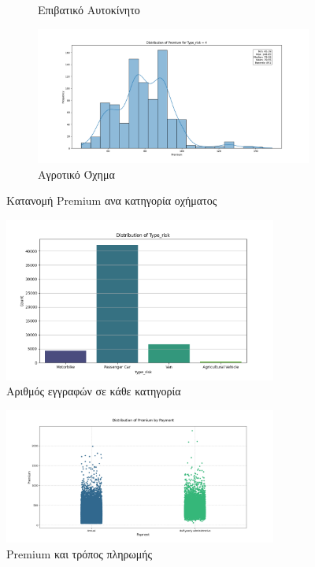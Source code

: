\documentclass{llncs}
\begin{document}
\begin{figure}[h!]
\begin{subfigure}{0.45\linewidth}
       \caption{Επιβατικό Αυτοκίνητο}
       \label{fig:subfig3}
        \end{subfigure}
         \begin{subfigure}{0.45\linewidth}
        \includegraphics[width=\linewidth]{images/premium_risk4.png}
        \caption{Αγροτικό Όχημα}
        \label{fig:subfig4}
         \end{subfigure}
  \caption{Κατανομή Premium ανα κατηγορία οχήματος}
  \label{fig:subfigures4}
\end{figure}

\begin{figure}
    \begin{center}
        \includegraphics[width=0.8\textwidth]{images/Type_risk.png}
    \end{center}
    \caption{Αριθμός εγγραφών σε κάθε κατηγορία} 
    \label{fig:Type_risk}   
\end{figure}

\begin{figure}
    \begin{center}
        \includegraphics[width=0.8\textwidth]{images/PaymentAll.png}
    \end{center}
    \caption{Premium και τρόπος πληρωμής} 
    \label{fig:premium_payment}   
\end{figure}
\end{document}

